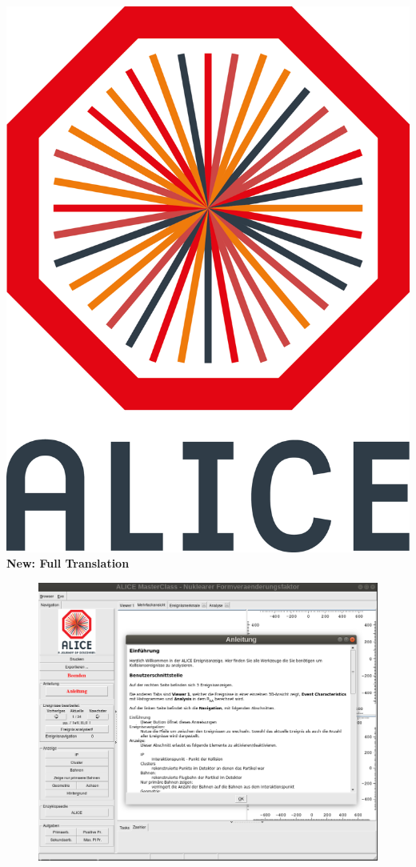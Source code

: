 \documentclass[aspectratio=169,14pt,dvipsnames]{beamer}
\begin{document}
\begin{frame}{\includegraphics[height=0.07\textheight]{2012-Jul-04-4_Color_Logo_CB.png} \hspace{0.2cm}\textbf{New: Full Translation}}
  \begin{figure}
    \centering
    \includegraphics[height=0.8\textheight]{GermanRaa.png}\hspace{0cm}
  \end{figure}
\end{frame}
\end{document}
